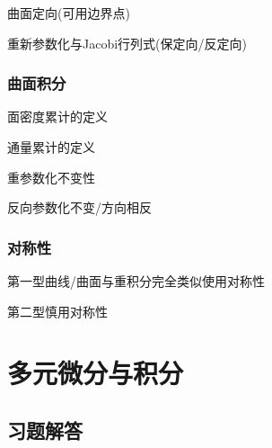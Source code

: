 \documentclass[a4paper,UTF8,fontset=windows,AutoFakeBold]{ctexart}
\theoremstyle{ex}
\begin{document}
曲面定向(可用边界点)

重新参数化与Jacobi行列式(保定向/反定向)

\subsubsection{曲面积分}
面密度累计的定义

通量累计的定义

重参数化不变性

反向参数化不变/方向相反


\subsubsection{对称性}
第一型曲线/曲面与重积分完全类似使用对称性

第二型慎用对称性

\newpage
\section{多元微分与积分}
\subsection{习题解答}
\end{document}
